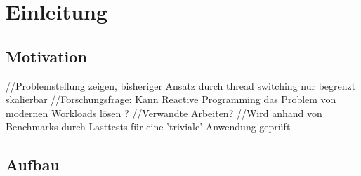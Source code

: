 \section{Einleitung}
\label{sec:einleitung}

\subsection{Motivation}
\label{subsec:motivation}
//Problemstellung zeigen, bisheriger Ansatz durch thread switching nur begrenzt skalierbar
//Forschungsfrage: Kann Reactive Programming das Problem von modernen Workloads lösen ?
//Verwandte Arbeiten?
//Wird anhand  von Benchmarks durch Lasttests für eine 'triviale' Anwendung geprüft
\subsection{Aufbau}
\label{subsec:aufbau}
